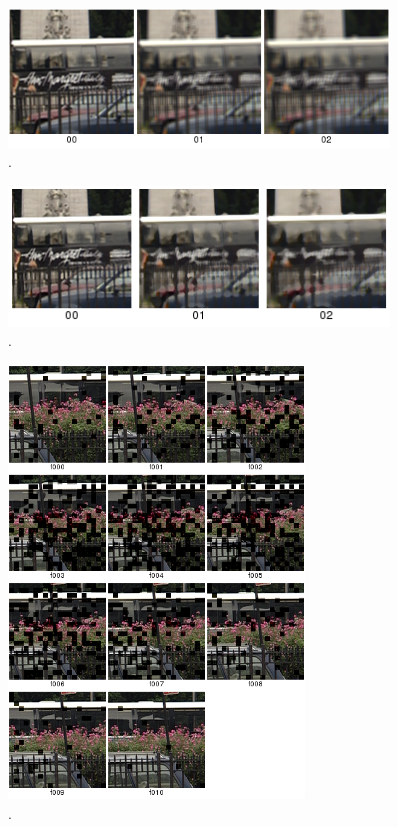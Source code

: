 \begin{figure}[!htb]
	\centering
	\includegraphics[width=0.9\textwidth]{./imgs/bluraverage.png}
	\caption{.}
	\label{fig:bluraverage}
\end{figure}

\begin{figure}[!htb]
	\centering
	\includegraphics[width=0.9\textwidth]{./imgs/blurmedian.png}
	\caption{.}
	\label{fig:blurmedian}
\end{figure}

\begin{figure}[!htb]
	\centering
	\includegraphics[width=0.7\textwidth]{./imgs/busraffle.png}
	\caption{.}
	\label{fig:busraffle}
\end{figure}

